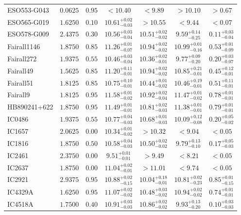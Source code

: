 \documentclass[onecolumn]{mn2e}
\begin{document}
{\begin{center}
\begin{longtable}{lcccccc}
ESO553-G043 & $0.0625$ & $0.95$ & $<10.40$ & $<9.89$ & $>10.10$ &$>0.67$ \\
ESO565-G019 & $1.6250$ & $0.10$ & $10.61_{-0.03}^{+0.02}$ & $>10.55$ & $<9.44$ &$<0.07$ \\
ESO578-G009 & $2.4375$ & $0.30$ & $10.56_{-0.04}^{+0.03}$ & $10.51_{-0.02}^{+0.02}$ & $9.59_{-0.25}^{+0.14}$ &$0.11_{-0.04}^{+0.03}$ \\
Fairall1146 & $1.8750$ & $0.85$ & $11.26_{-0.07}^{+0.01}$ & $10.94_{-0.02}^{+0.02}$ & $10.99_{-0.16}^{+0.01}$ &$0.53_{-0.09}^{+0.01}$ \\
Fairall272 & $1.9375$ & $0.55$ & $10.46_{-0.04}^{+0.03}$ & $10.36_{-0.01}^{+0.02}$ & $9.77_{-0.20}^{+0.09}$ &$0.20_{-0.07}^{+0.03}$ \\
Fairall49 & $1.5625$ & $0.85$ & $11.20_{-0.01}^{+0.11}$ & $10.94_{-0.02}^{+0.02}$ & $10.85_{-0.01}^{+0.21}$ &$0.45_{-0.01}^{+0.12}$ \\
Fairall51 & $1.8125$ & $0.85$ & $10.75_{-0.01}^{+0.10}$ & $10.44_{-0.02}^{+0.01}$ & $10.46_{-0.01}^{+0.19}$ &$0.51_{-0.01}^{+0.11}$ \\
Fairall9 & $1.8125$ & $0.95$ & $11.58_{-0.02}^{+0.01}$ & $10.92_{-0.04}^{+0.02}$ & $11.47_{-0.02}^{+0.01}$ &$0.78_{-0.01}^{+0.01}$ \\
HB890241+622 & $1.8750$ & $0.95$ & $11.49_{-0.01}^{+0.01}$ & $10.81_{-0.03}^{+0.02}$ & $11.38_{-0.01}^{+0.01}$ &$0.79_{-0.01}^{+0.01}$ \\
IC0486 & $1.9375$ & $0.55$ & $10.77_{-0.03}^{+0.04}$ & $10.68_{-0.03}^{+0.01}$ & $10.09_{-0.08}^{+0.12}$ &$0.20_{-0.02}^{+0.05}$ \\
IC1657 & $2.0625$ & $0.00$ & $10.34_{-0.02}^{+0.01}$ & $>10.32$ & $<9.04$ &$<0.05$ \\
IC1816 & $1.8750$ & $0.50$ & $10.58_{-0.03}^{+0.04}$ & $10.50_{-0.02}^{+0.02}$ & $9.79_{-0.10}^{+0.13}$ &$0.17_{-0.03}^{+0.05}$ \\
IC2461 & $2.3750$ & $0.00$ & $9.51_{-0.01}^{+0.01}$ & $>9.49$ & $<8.21$ &$<0.05$ \\
IC2637 & $1.8750$ & $0.00$ & $11.04_{-0.01}^{+0.02}$ & $>11.01$ & $<9.74$ &$<0.05$ \\
IC2921 & $2.9375$ & $0.95$ & $10.88_{-0.15}^{+0.02}$ & $10.04_{-0.01}^{+0.18}$ & $10.81_{-0.23}^{+0.02}$ &$0.85_{-0.15}^{+0.01}$ \\
IC4329A & $1.6250$ & $0.95$ & $11.07_{-0.02}^{+0.02}$ & $10.48_{-0.02}^{+0.03}$ & $10.94_{-0.02}^{+0.02}$ &$0.74_{-0.01}^{+0.01}$ \\
IC4518A & $1.7500$ & $0.40$ & $10.91_{-0.03}^{+0.03}$ & $10.86_{-0.02}^{+0.02}$ & $9.93_{-0.20}^{+0.13}$ &$0.10_{-0.03}^{+0.03}$ \\

\end{longtable}
\end{center}}
\end{document}
